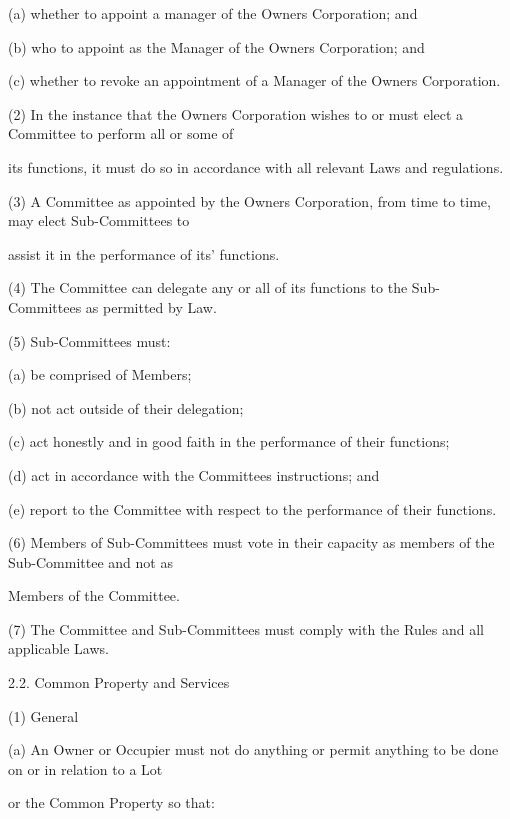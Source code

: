 \documentclass{article}
\begin{document}
{\fontsize{9.962}{1}(a) whether to appoint a manager of the Owners Corporation; and }

{\fontsize{9.962}{1}(b) who to appoint as the Manager of the Owners Corporation; and }

{\fontsize{9.962}{1}(c) whether to revoke an appointment of a Manager of the Owners Corporation. }

{\fontsize{9.962}{1}(2) In the instance that the Owners Corporation wishes to or must elect a Committee to perform all or some of }

{\fontsize{10.02}{1}its functions, it must do so in accordance with all relevant Laws and regulations. }

{\fontsize{9.962}{1}(3) A Committee as appointed by the Owners Corporation, from time to time, may elect Sub-Committees to }

{\fontsize{10.02}{1}assist it in the performance of its’ functions. }

{\fontsize{9.962}{1}(4) The Committee can delegate any or all of its functions to the Sub-Committees as permitted by Law. }

{\fontsize{9.962}{1}(5) Sub-Committees must: }

{\fontsize{9.962}{1}(a) be comprised of Members; }

{\fontsize{9.962}{1}(b) not act outside of their delegation; }

{\fontsize{9.962}{1}(c) act honestly and in good faith in the performance of their functions; }

{\fontsize{9.962}{1}(d) act in accordance with the Committees instructions; and }

{\fontsize{9.962}{1}(e) report to the Committee with respect to the performance of their functions. }

{\fontsize{9.962}{1}(6) Members of Sub-Committees must vote in their capacity as members of the Sub-Committee and not as }

{\fontsize{10.02}{1}Members of the Committee. }

{\fontsize{9.962}{1}(7) The Committee and Sub-Committees must comply with the Rules and all applicable Laws. }

{\fontsize{9.99}{1}2.2. Common Property and Services }

{\fontsize{9.962}{1}(1) General }

{\fontsize{9.962}{1}(a) An Owner or Occupier must not do anything or permit anything to be done on or in relation to a Lot }

{\fontsize{10.02}{1}or the Common Property so that: }
\end{document}
